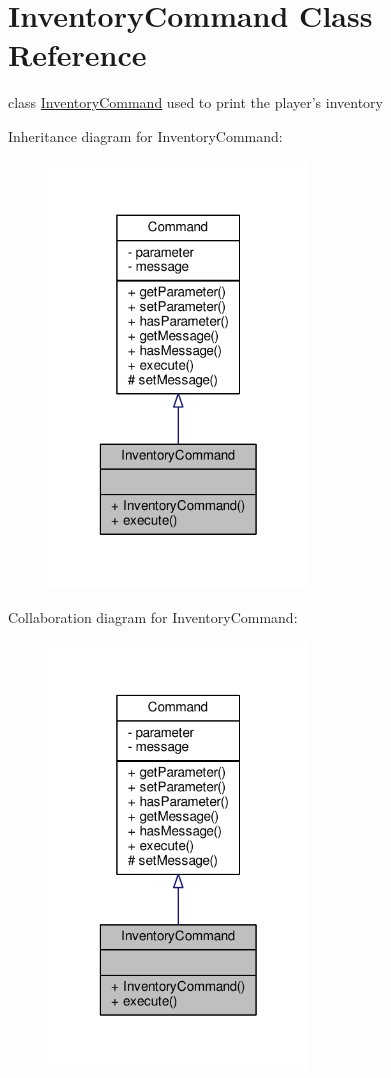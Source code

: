 \hypertarget{classInventoryCommand}{\section{Inventory\-Command Class Reference}
\label{classInventoryCommand}
}


class \hyperlink{classInventoryCommand}{Inventory\-Command} used to print the player's inventory  




Inheritance diagram for Inventory\-Command\-:
\nopagebreak
\begin{figure}[H]
\begin{center}
\leavevmode
\includegraphics[width=196pt]{classInventoryCommand__inherit__graph}
\end{center}
\end{figure}


Collaboration diagram for Inventory\-Command\-:
\nopagebreak
\begin{figure}[H]
\begin{center}
\leavevmode
\includegraphics[width=196pt]{classInventoryCommand__coll__graph}
\end{center}
\end{figure}
